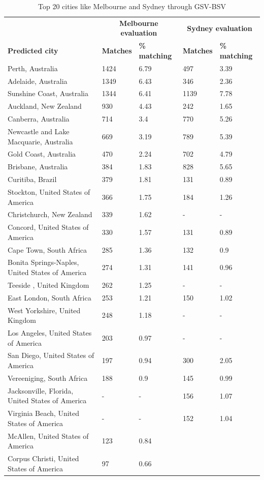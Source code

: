 \documentclass[final,3p,times,authoryear]{elsarticle}
\begin{document}
\begin{table}[!htbp]
\caption{Top 20 cities like Melbourne and Sydney through GSV-BSV \label{tab:melbournesydneyGSV}}     
\begin{tabular}{| l | l |l| l | l|}
\hline
 \hline    &  \multicolumn{2}{c|}{\textbf{Melbourne evaluation}} & \multicolumn{2}{c|}{\textbf{Sydney evaluation}}  \\  
\textbf{Predicted city} & \textbf{Matches} & \textbf{\% matching}  & \textbf{Matches} & \textbf{\% matching}\\ \hline

Perth, Australia & 1424 & 6.79 & 497 & 3.39 \\ \hline
Adelaide, Australia & 1349 & 6.43 & 346 & 2.36 \\ \hline
Sunshine Coast, Australia & 1344 & 6.41 & 1139 & 7.78 \\ \hline
Auckland, New Zealand & 930 & 4.43 & 242 & 1.65 \\ \hline
Canberra, Australia & 714 & 3.4 & 770 & 5.26 \\ \hline
Newcastle and Lake Macquarie, Australia & 669 & 3.19 & 789 & 5.39 \\ \hline
Gold Coast, Australia & 470 & 2.24 & 702 & 4.79 \\ \hline
Brisbane, Australia & 384 & 1.83 & 828 & 5.65 \\ \hline
Curitiba, Brazil & 379 & 1.81 & 131 & 0.89 \\ \hline
Stockton, United States of America & 366 & 1.75 & 184 & 1.26 \\ \hline
Christchurch, New Zealand & 339 & 1.62 &-&- \\ \hline
Concord, United States of America & 330 & 1.57 & 131 & 0.89 \\ \hline
Cape Town, South Africa & 285 & 1.36 & 132 & 0.9 \\ \hline
Bonita Springs-Naples, United States of America & 274 & 1.31 & 141 & 0.96 \\ \hline
Teeside , United Kingdom & 262 & 1.25 &-&- \\ \hline
East London, South Africa & 253 & 1.21 & 150 & 1.02 \\ \hline
West Yorkshire, United Kingdom & 248 & 1.18 &-&- \\ \hline
Los Angeles, United States of America & 203 & 0.97 &-&- \\ \hline
San Diego, United States of America & 197 & 0.94 & 300 & 2.05 \\ \hline
Vereeniging, South Africa & 188 & 0.9 & 145 & 0.99 \\ \hline
Jacksonville, Florida, United States of America  &-&- & 156 & 1.07\\ \hline
Virginia Beach, United States of America  &-&- & 152 & 1.04\\ \hline
McAllen, United States of America & 123 & 0.84\\ \hline
Corpus Christi, United States of America & 97 & 0.66\\ \hline

\end{tabular}
\end{table}
\end{document}
